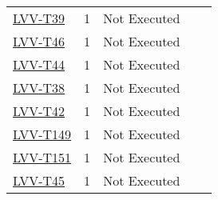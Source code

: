 \documentclass[DM,lsstdraft,STR,toc]{lsstdoc}
\begin{document}
{\begin{longtable}{p{2cm}cp{2.3cm}p{8.6cm}p{2.3cm}}
\begin{minipage}[]{9cm}
\medskip
\end{minipage}
&
\\\hline
\href{https://jira.lsstcorp.org/secure/Tests.jspa#/testCase/LVV-T39}{LVV-T39}
&  1
& Not Executed &
\begin{minipage}[]{9cm}
\smallskip

\medskip
\end{minipage}
&
\\\hline
\href{https://jira.lsstcorp.org/secure/Tests.jspa#/testCase/LVV-T46}{LVV-T46}
&  1
& Not Executed &
\begin{minipage}[]{9cm}
\smallskip

\medskip
\end{minipage}
&
\\\hline
\href{https://jira.lsstcorp.org/secure/Tests.jspa#/testCase/LVV-T44}{LVV-T44}
&  1
& Not Executed &
\begin{minipage}[]{9cm}
\smallskip

\medskip
\end{minipage}
&
\\\hline
\href{https://jira.lsstcorp.org/secure/Tests.jspa#/testCase/LVV-T38}{LVV-T38}
&  1
& Not Executed &
\begin{minipage}[]{9cm}
\smallskip

\medskip
\end{minipage}
&
\\\hline
\href{https://jira.lsstcorp.org/secure/Tests.jspa#/testCase/LVV-T42}{LVV-T42}
&  1
& Not Executed &
\begin{minipage}[]{9cm}
\smallskip

\medskip
\end{minipage}
&
\\\hline
\href{https://jira.lsstcorp.org/secure/Tests.jspa#/testCase/LVV-T149}{LVV-T149}
&  1
& Not Executed &
\begin{minipage}[]{9cm}
\smallskip

\medskip
\end{minipage}
&
\\\hline
\href{https://jira.lsstcorp.org/secure/Tests.jspa#/testCase/LVV-T151}{LVV-T151}
&  1
& Not Executed &
\begin{minipage}[]{9cm}
\smallskip

\medskip
\end{minipage}
&
\\\hline
\href{https://jira.lsstcorp.org/secure/Tests.jspa#/testCase/LVV-T45}{LVV-T45}
&  1
& Not Executed &
\begin{minipage}[]{9cm}
\smallskip


\end{minipage}
\end{longtable}}
\end{document}
